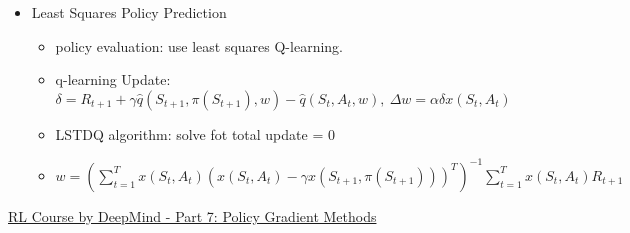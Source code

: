 \begin{itemize}
\begin{itemize}[noitemsep,nolistsep]
		\item Least Squares Policy Prediction
		\begin{itemize}[noitemsep,nolistsep]
			\item policy evaluation: use least squares Q-learning.
			\item q-learning Update: $\delta = R_{t+1} + \gamma \hat{q}(S_{t+1},\pi(S_{t+1}), w) - \hat{q}(S_t,A_t,w),\ \Delta w = \alpha \delta x(S_t,A_t)$
			\item LSTDQ algorithm: solve fot total update = 0
			\item $w = (\sum_{t=1}^T x(S_t,A_t)(x(S_t,A_t) - \gamma x(S_{t+1},\pi(S_{t+1})))^T)^{-1} \sum_{t=1}^T x(S_t,A_t)R_{t+1}$
		\end{itemize}
	\end{itemize}
\end{itemize}
\href{https://www.youtube.com/watch?v=KHZVXao4qXs}{RL Course by DeepMind - Part 7: Policy Gradient Methods}
